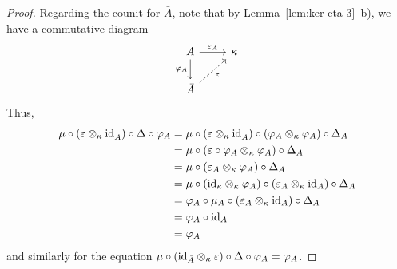 \begin{proof}
    Regarding the counit for $\bar A$, note that by Lemma~\ref{lem:ker-eta-3}~b), we have a commutative diagram
    $$
        \begin{tikzcd}
            A
                    \arrow[r,"\varepsilon_A"]
                    \arrow[d,"\varphi_A"']
                &\kappa\\
            \bar A
                    \arrow[ru,"\varepsilon"',dashed]
        \end{tikzcd}
    $$
    Thus,
    \begin{align*}
        \mu\circ(\varepsilon\otimes_\kappa\text{\rm id}_{\bar A})
                \circ\Delta\circ\varphi_A
            &= \mu\circ(\varepsilon\otimes_\kappa\text{\rm id}_{\bar A})
                \circ(\varphi_A\otimes_\kappa\varphi_A)\circ\Delta_A\\
            &= \mu\circ(\varepsilon
                \circ\varphi_A\otimes_\kappa\varphi_A)\circ\Delta_A\\
            &= \mu\circ(\varepsilon_A\otimes_\kappa\varphi_A)
                \circ\Delta_A\\
            &= \mu\circ(\text{\rm id}_\kappa\otimes_\kappa\varphi_A)
                \circ (\varepsilon_A\otimes_\kappa\text{\rm id}_A)
                \circ\Delta_A\\
            &= \varphi_A\circ\mu_A
                \circ(\varepsilon_A\otimes_\kappa\text{\rm id}_A)
                \circ\Delta_A\\
            &= \varphi_A\circ\text{\rm id}_A\\
            &= \varphi_A
    \end{align*}
    and similarly for the equation $\mu\circ(\text{\rm id}_{\bar A}\otimes_\kappa\varepsilon)
                \circ\Delta\circ\varphi_A = \varphi_A$.


\end{proof}
